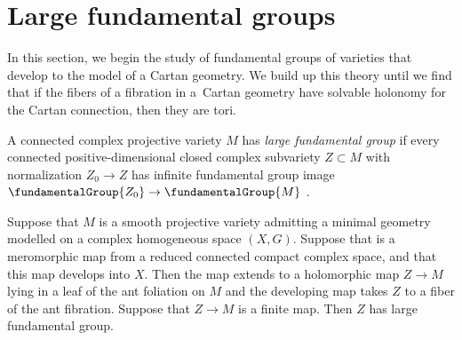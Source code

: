 \section{Large fundamental groups}\label{section:Large.fundamental.groups}
In this section, we begin the study of fundamental groups of varieties that develop to the model of a Cartan geometry.
We build up this theory until we find that if the fibers of a fibration in a~Cartan geometry have solvable holonomy for the Cartan connection, then they are tori.

A connected complex projective variety $M$ has \emph{large fundamental group} if every connected positive-dimensional closed
complex subvariety $Z \subset M$ with normalization $Z_0 \to Z$ has infinite fundamental group image $\fundamentalGroup{Z_0} \to \fundamentalGroup{M}$ \cite{Kollar:1993}.

\begin{Lemma}\label{lemma:dev.large}
Suppose that $M$ is a smooth projective variety admitting a minimal geometry modelled on a complex homogeneous space $(X, G)$.
Suppose that  is a meromorphic map from a reduced connected compact complex space, and that this map develops into $X$.
Then the map extends to a holomorphic map $Z \to M$ lying in a leaf of the ant foliation on $M$ and the developing map takes $Z$ to a fiber of the ant fibration.
Suppose that $Z \to M$ is a finite map.
Then $Z$ has large fundamental group.
\end{Lemma}

